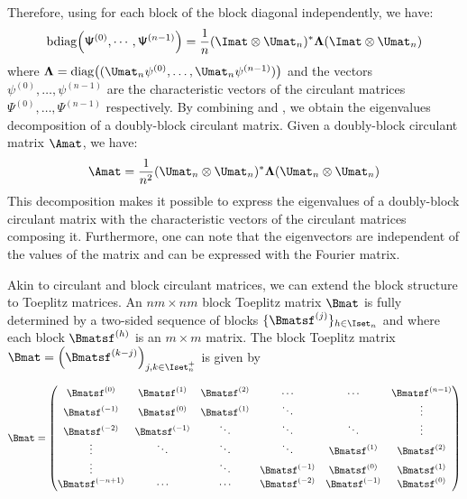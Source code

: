Therefore, using  for each block of the block diagonal independently, we have:
\begin{equation} \label{equation:ch2-diagonalization_circulant_with_bdiag}
  \bdiag\leftmat \mathsf{\Psi}^{(0)}, \cdots, \mathsf{\Psi}^{(n-1)} \rightmat = \frac{1}{n} (\Imat \otimes \Umat_n)^* \boldsymbol{\Lambda} (\Imat \otimes \Umat_n)
\end{equation}
where $\boldsymbol{\Lambda} = \diag\left((\Umat_n \mathsf{\psi}^{(0)}, \dots, \Umat_n \mathsf{\psi}^{(n-1)})\right)$ and the vectors $\mathsf{\psi}^{(0)}, \dots, \mathsf{\psi}^{(n-1)}$ are the characteristic vectors of the circulant matrices $\mathsf{\Psi}^{(0)}, \dots, \mathsf{\Psi}^{(n-1)}$ respectively.
By combining  and , we obtain the eigenvalues decomposition of a doubly-block circulant matrix.
Given a doubly-block circulant matrix $\Amat$, we have:
\begin{equation} \label{equation:ch2-diagonalization_doubly_block_circulant_matrix}
  \Amat = \frac{1}{n^2} (\Umat_n \otimes \Umat_n)^* \boldsymbol{\Lambda} (\Umat_n \otimes \Umat_n) 
\end{equation}
This decomposition makes it possible to express the eigenvalues of a doubly-block circulant matrix with the characteristic vectors of the circulant matrices composing it.
Furthermore, one can note that the eigenvectors are independent of the values of the matrix and can be expressed with the Fourier matrix.


Akin to circulant and block circulant matrices, we can extend the block structure to Toeplitz matrices.
An $nm \times nm$ block Toeplitz matrix $\Bmat$ is fully determined by a two-sided sequence of blocks $\{\Bmatsf^{(j)}\}_{h \in \Iset_n}$ and where each block $\Bmatsf^{(h)}$ is an $m \times m$ matrix.
The block Toeplitz matrix $\Bmat = \leftmat\Bmatsf^{(k-j)} \rightmat_{j,k \in \Iset^+_n}$ is given by

\begin{equation} \label{equation:ch2-block_toeplitz_matrices}
  \Bmat = 
  \leftmatrix
    \Bmatsf^{(0)}    & \Bmatsf^{(1)}  & \Bmatsf^{(2)} & \cdots         & \cdots         & \Bmatsf^{(n-1)} \\
    \Bmatsf^{(-1)}   & \Bmatsf^{(0)}  & \Bmatsf^{(1)} & \ddots         &                & \vdots          \\
    \Bmatsf^{(-2)}   & \Bmatsf^{(-1)} & \ddots        & \ddots         & \ddots         & \vdots          \\ 
    \vdots           & \ddots         & \ddots        & \ddots         & \Bmatsf^{(1)}  & \Bmatsf^{(2)}   \\
    \vdots           &                & \ddots        & \Bmatsf^{(-1)} & \Bmatsf^{(0)}  & \Bmatsf^{(1)}   \\
    \Bmatsf^{(-n+1)} & \cdots         & \cdots        & \Bmatsf^{(-2)} & \Bmatsf^{(-1)} & \Bmatsf^{(0)}
  \rightmatrix
\end{equation}

